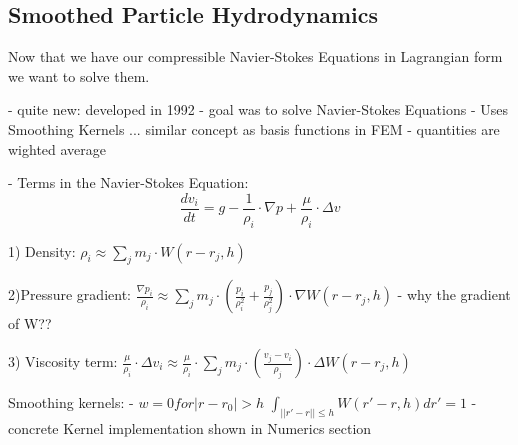 \subsection{Smoothed Particle Hydrodynamics}
Now that we have our compressible Navier-Stokes Equations in Lagrangian form we want to solve them.

- quite new: developed in 1992
- goal was to solve Navier-Stokes Equations
- Uses Smoothing Kernels ... similar concept as basis functions in FEM
- quantities are wighted average

- Terms in the Navier-Stokes Equation:
\begin{equation} \frac{dv_i}{dt} = g - \frac{1}{\rho_i}\cdot \nabla p + \frac{\mu}{\rho_i} \cdot \Delta  v \end{equation}

1) Density:
$ \rho_i \approx \sum_j m_j \cdot W(r - r_j,h) $

2)Pressure gradient:
$ \frac{\nabla p_i}{\rho_i} \approx \sum_j m_j \cdot (\frac{p_i}{\rho^2_i} + \frac{p_j}{\rho^2_j}) \cdot \nabla W(r - r_j, h) $
- why the gradient of W??

3) Viscosity term:
$ \frac{\mu}{\rho_i} \cdot \Delta v_i \approx \frac{\mu}{\rho_i} \cdot \sum_j m_j \cdot (\frac{v_j - v_i}{\rho_j}) \cdot \Delta W(r - r_j, h) $

Smoothing kernels:
- $ w = 0 for |r - r_0| > h $
$ \int_{||r' - r|| \leq h} W(r' - r, h)dr' = 1 $
- concrete Kernel implementation shown in Numerics section
